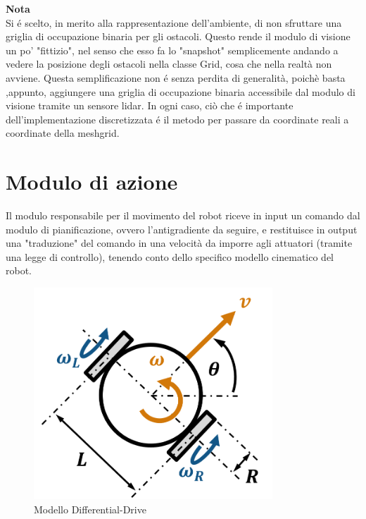 \documentclass[14pt,a4paper]{extarticle}
\begin{document}
\begin{nota}
\textbf{Nota}\\ Si é scelto, in merito alla rappresentazione dell'ambiente, di non sfruttare una griglia di occupazione binaria per gli ostacoli. Questo rende il modulo di visione un po' "fittizio", nel senso che esso fa lo "snapshot" semplicemente andando a vedere la posizione degli ostacoli nella classe Grid, cosa che nella realtà non avviene. Questa semplificazione non é senza perdita di generalità, poichè basta ,appunto, aggiungere una griglia di occupazione binaria accessibile dal modulo di visione tramite un sensore lidar. In ogni caso, ciò che é importante dell'implementazione discretizzata é il metodo per passare da coordinate reali a coordinate della meshgrid.
\end{nota}


\section{Modulo di azione}
Il modulo responsabile per il movimento del robot riceve in input un comando dal modulo di pianificazione, ovvero l'antigradiente da seguire, e restituisce in output una "traduzione" del comando in una velocità da imporre agli attuatori (tramite una legge di controllo), tenendo conto dello specifico modello cinematico del robot. 
\begin{figure}[h]
\centering
\caption{Modello Differential-Drive \cite{toolbox}} \label{dd}
\includegraphics[width=0.8\textwidth]{DD.png}
\end{figure}
\end{document}
